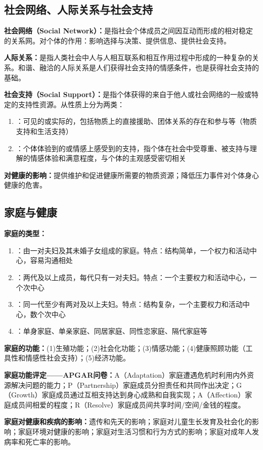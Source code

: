 \subsection{社会网络、人际关系与社会支持}

\begin{keybox}
\textbf{社会网络（Social Network）：}是指社会个体成员之间因互动而形成的相对稳定的关系网。对个体的作用：影响选择与决策、提供信息、提供社会支持。

\textbf{人际关系：}是指人类社会中人与人相互联系和相互作用过程中形成的一种复杂的关系。和谐、融洽的人际关系是人们获得社会支持的情感条件，也是获得社会支持的基础。

\textbf{社会支持（Social Support）：}是指个体获得的来自于他人或社会网络的一般或特定的支持性资源。从性质上分为两类：
\begin{enumerate}[leftmargin=*]
    \item {}：可见的或实际的，包括物质上的直接援助、团体关系的存在和参与等（物质支持和生活支持）
    \item {}：个体体验到的或情感上感受到的支持，指个体在社会中受尊重、被支持与理解的情感体验和满意程度，与个体的主观感受密切相关
\end{enumerate}

\textbf{对健康的影响：}提供维护和促进健康所需要的物质资源；降低压力事件对个体身心健康的危害。
\end{keybox}

\subsection{家庭与健康}

\begin{keybox}
\textbf{家庭的类型：}
\begin{enumerate}[leftmargin=*]
    \item {}：由一对夫妇及其未婚子女组成的家庭。特点：结构简单，一个权力和活动中心，容易沟通相处
    \item {}：两代及以上成员，每代只有一对夫妇。特点：一个主要权力和活动中心，一个次中心
    \item {}：同一代至少有两对及以上夫妇。特点：结构复杂，一个主要权力和活动中心，数个次中心
    \item {}：单身家庭、单亲家庭、同居家庭、同性恋家庭、隔代家庭等
\end{enumerate}

\textbf{家庭的功能：}(1)生殖功能；(2)社会化功能；(3)情感功能；(4)健康照顾功能（工具性和情感性社会支持）；(5)经济功能。

\textbf{家庭功能评定——APGAR问卷：}A（Adaptation）家庭遭遇危机时利用内外资源解决问题的能力；P（Partnership）家庭成员分担责任和共同作出决定；G（Growth）家庭成员通过互相支持达到身心成熟和自我实现；A（Affection）家庭成员间相爱的程度；R（Resolve）家庭成员间共享时间/空间/金钱的程度。

\textbf{家庭对健康和疾病的影响：}遗传和先天的影响；家庭对儿童生长发育及社会化的影响；家庭环境对健康的影响；家庭对生活习惯和行为方式的影响；家庭对成年人发病率和死亡率的影响。
\end{keybox}


